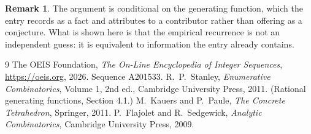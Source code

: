 \documentclass[11pt,a4paper]{article}
\theoremstyle{plain}
\theoremstyle{definition}
\newtheorem{remark}[theorem]{Remark}
\begin{document}
\begin{remark}
The argument is conditional on the generating function, which the entry records as a fact and
attributes to a contributor rather than offering as a conjecture. What is shown here is that
the empirical recurrence is not an independent guess: it is equivalent to information the
entry already contains.
\end{remark}

\begin{thebibliography}{9}
 The OEIS Foundation, \emph{The On-Line Encyclopedia of Integer
Sequences}, \url{https://oeis.org}, 2026. Sequence A201533.
 R.~P.~Stanley, \emph{Enumerative Combinatorics}, Volume 1, 2nd ed.,
Cambridge University Press, 2011. (Rational generating functions, Section 4.1.)
 M.~Kauers and P.~Paule, \emph{The Concrete Tetrahedron}, Springer, 2011.
 P.~Flajolet and R.~Sedgewick, \emph{Analytic Combinatorics}, Cambridge
University Press, 2009.
\end{thebibliography}
\end{document}
